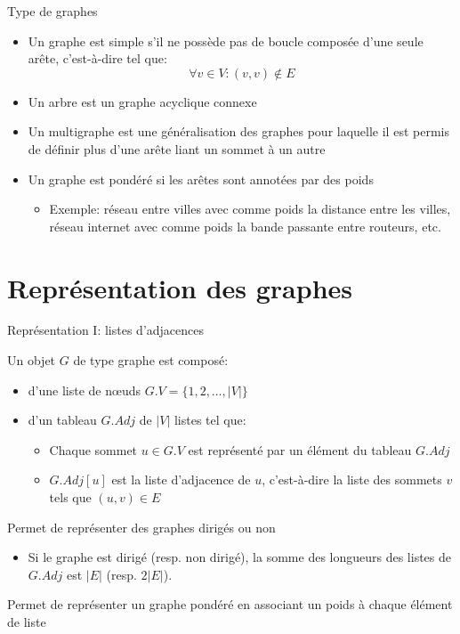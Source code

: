 \begin{frame}{Type de graphes}
\begin{itemize}
\item Un graphe est \alert{simple} s'il ne possède pas de boucle composée d'une seule arête, c'est-à-dire tel que:
$$\forall v \in V: (v,v)\notin E$$
\item Un \alert{arbre} est un graphe acyclique connexe
\item Un \alert{multigraphe} est une généralisation des graphes pour laquelle
  il est permis de définir plus d'une arête liant un sommet à un autre

\bigskip

\item Un graphe est \alert{pondéré} si les arêtes sont annotées par des \alert{poids}
\begin{itemize}
\item Exemple: réseau entre villes avec comme poids la distance entre
  les villes, réseau internet avec comme poids la bande passante entre routeurs, etc.
\end{itemize}
\end{itemize}
\end{frame}

\section{Représentation des graphes}

\begin{frame}{Représentation I: listes d'adjacences}

Un objet $G$ de type graphe est composé:
\begin{itemize}
\item d'une liste de n\oe uds $G.V=\{1,2,\ldots,|V|\}$
\item d'un tableau $G.Adj$ de $|V|$ listes tel que:
\begin{itemize}
\item Chaque sommet $u\in G.V$ est représenté par un élément du tableau $G.Adj$
\item $G.Adj[u]$ est la liste d'adjacence de $u$, c'est-à-dire la
  liste des sommets $v$ tels que $(u,v)\in E$
\end{itemize}
\end{itemize}

\bigskip

Permet de représenter des graphes dirigés ou non
\begin{itemize}
\item Si le graphe est dirigé (resp. non dirigé), la somme des longueurs des listes de $G.Adj$ est 
$|E|$ (resp. $2|E|$).
\end{itemize}

\bigskip

Permet de représenter un graphe pondéré en associant un poids à chaque
élément de liste

\end{frame}

